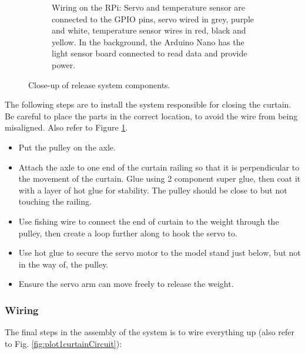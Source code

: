\documentclass[a4paper,12pt]{article}
\begin{document}
\begin{figure}
\begin{subfigure}{0.5\textwidth}
        \caption{Wiring on the RPi:
        Servo and temperature sensor are connected to the GPIO pins, servo wired in grey, purple and white, 
        temperature sensor wires in red, black and yellow.
        In the background, the Arduino Nano has the light sensor board connected to read data and provide power.}
    \end{subfigure}

    \caption{Close-up of release system components.}
    \label{fig:closeUpOfSys}
\end{figure}

The following steps are to install the system responsible for closing the curtain. Be careful to place the parts in the correct location, 
to avoid the wire from being misaligned. Also refer to Figure \ref{fig:closeUpOfSys}.

\begin{itemize}
    \item Put the pulley on the axle.
    \item Attach the axle to one end of the curtain railing so that it is perpendicular to the movement of the curtain. 
    Glue using 2 component super glue, then coat it with a layer of hot glue for stability. 
    The pulley should be close to but not touching the railing.
    \item Use fishing wire to connect the end of curtain to the weight through the pulley, then create a loop further along to hook the servo to.
    \item Use hot glue to secure the servo motor to the model stand just below, but not in the way of, the pulley.
    \item Ensure the servo arm can move freely to release the weight.
\end{itemize}

\subsubsection{Wiring}

The final steps in the assembly of the system is to wire everything up (also refer to Fig. \ref{fig:plot1curtainCircuit}):
\end{document}
